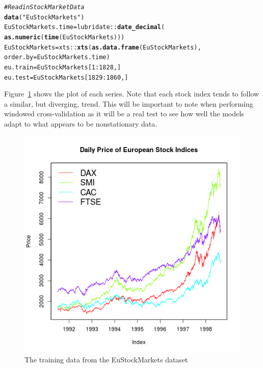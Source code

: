 \documentclass[12pt]{article}\usepackage[]{graphicx}\usepackage[]{color}
\makeatletter
\newcommand{\hlnum}[1]{\textcolor[rgb]{0.686,0.059,0.569}{#1}}%
\newcommand{\hlstr}[1]{\textcolor[rgb]{0.192,0.494,0.8}{#1}}%
\newcommand{\hlcom}[1]{\textcolor[rgb]{0.678,0.584,0.686}{\textit{#1}}}%
\newcommand{\hlopt}[1]{\textcolor[rgb]{0,0,0}{#1}}%
\newcommand{\hlstd}[1]{\textcolor[rgb]{0.345,0.345,0.345}{#1}}%
\newcommand{\hlkwb}[1]{\textcolor[rgb]{0.69,0.353,0.396}{#1}}%
\newcommand{\hlkwc}[1]{\textcolor[rgb]{0.333,0.667,0.333}{#1}}%
\newcommand{\hlkwd}[1]{\textcolor[rgb]{0.737,0.353,0.396}{\textbf{#1}}}%
\newenvironment{kframe}{%
 \def\at@end@of@kframe{}%
 \ifinner\ifhmode%
  \def\at@end@of@kframe{\end{minipage}}%
  \begin{minipage}{\columnwidth}%
 \fi\fi%
 \def\FrameCommand##1{\hskip\@totalleftmargin \hskip-\fboxsep
 \colorbox{shadecolor}{##1}\hskip-\fboxsep
     \hskip-\linewidth \hskip-\@totalleftmargin \hskip\columnwidth}%
 \MakeFramed {\advance\hsize-\width
   \@totalleftmargin\z@ \linewidth\hsize
   \@setminipage}}%
 {\par\unskip\endMakeFramed%
 \at@end@of@kframe}
\newenvironment{knitrout}{}{} %
\theoremstyle{definition}
\makeatother
\begin{document}
\singlespace
\begin{knitrout}
\color{fgcolor}\begin{kframe}
\begin{alltt}
\hlcom{# Read in Stock Market Data}
\hlkwd{data}\hlstd{(}\hlstr{"EuStockMarkets"}\hlstd{)}
\hlstd{EuStockMarkets.time} \hlkwb{=} \hlstd{lubridate}\hlopt{::}\hlkwd{date_decimal}\hlstd{(}
                \hlkwd{as.numeric}\hlstd{(}\hlkwd{time}\hlstd{(EuStockMarkets)))}
\hlstd{EuStockMarkets}  \hlkwb{=} \hlstd{xts}\hlopt{::}\hlkwd{xts}\hlstd{(}\hlkwd{as.data.frame}\hlstd{(EuStockMarkets),}
                           \hlkwc{order.by} \hlstd{= EuStockMarkets.time)}
\hlstd{eu.train} \hlkwb{=} \hlstd{EuStockMarkets[}\hlnum{1}\hlopt{:}\hlnum{1828}\hlstd{,]}
\hlstd{eu.test} \hlkwb{=} \hlstd{EuStockMarkets[}\hlnum{1829}\hlopt{:}\hlnum{1860}\hlstd{,]}
\end{alltt}
\end{kframe}
\end{knitrout}



\doublespacing

Figure~\ref{fig:eu_train} shows the plot of each series. Note that each stock index tends to follow a similar, but diverging, trend. This will be important to note when performing windowed cross-validation as it will be a real test to see how well the models adapt to what appears to be nonstationary data.

\begin{figure}[h!]
\includegraphics[width=\linewidth]{plot_eu_train.png}
\centering
\caption{The training data from the EuStockMarkets dataset}
\label{fig:eu_train}
\end{figure}
\end{document}
